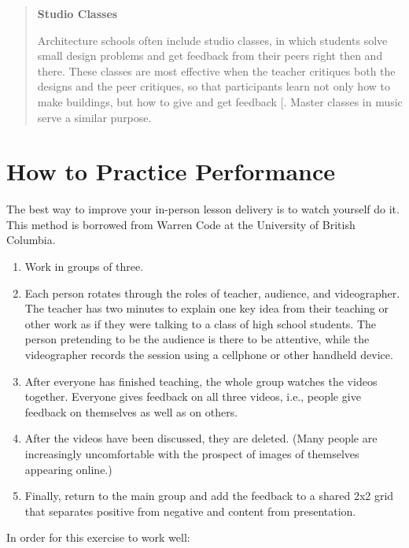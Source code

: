 \begin{quote}\setlength{\parindent}{0pt}
\textbf{Studio Classes}

Architecture schools often include studio classes, in which students
solve small design problems and get feedback from their peers right
then and there. These classes are most effective when the teacher
critiques both the designs and the peer critiques, so that
participants learn not only how to make buildings, but how to give and
get feedback {[}\protect[\hyperlink{b:Scho1984}{Scho1984}]{]}. Master classes in music serve a
similar purpose.
\end{quote}

\section{How to Practice Performance}\label{s:performance-practice}

The best way to improve your in-person lesson delivery is to watch
yourself do it. This method is borrowed from Warren Code at the
University of British Columbia.

\begin{enumerate}
\item
  Work in groups of three.
\item
  Each person rotates through the roles of teacher, audience, and
  videographer. The teacher has two minutes to explain one key idea
  from their teaching or other work as if they were talking to a class
  of high school students. The person pretending to be the audience is
  there to be attentive, while the videographer records the session
  using a cellphone or other handheld device.
\item
  After everyone has finished teaching, the whole group watches the
  videos together. Everyone gives feedback on all three videos, i.e.,
  people give feedback on themselves as well as on others.
\item
  After the videos have been discussed, they are deleted. (Many people
  are increasingly uncomfortable with the prospect of images of
  themselves appearing online.)
\item
  Finally, return to the main group and add the feedback to a shared
  2x2 grid that separates positive from negative and content from
  presentation.
\end{enumerate}

In order for this exercise to work well:

